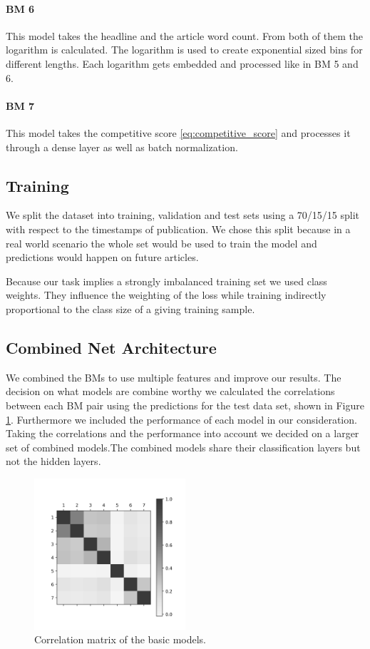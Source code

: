 \paragraph{BM 6} This model takes the headline and the article word count. From both of them the logarithm is calculated. The logarithm is used to create exponential sized bins for different lengths. Each logarithm gets embedded and processed like in BM 5 and 6.
\paragraph{BM 7} This model takes the competitive score \ref{eq:competitive_score} and processes it through a dense layer as well as batch normalization.

\subsection{Training}
We split the dataset into training, validation and test sets using a 70/15/15 split with respect to the timestamps of publication. We chose this split because in a real world scenario the whole set would be used to train the model and predictions would happen on future articles.

Because our task implies a strongly imbalanced training set we used class weights. They influence the weighting of the loss while training indirectly proportional to the class size of a giving training sample.

\subsection{Combined Net Architecture}
We combined the BMs to use multiple features and improve our results. The decision on what models are combine worthy we calculated the correlations between each BM pair using the predictions for the test data set, shown in Figure \ref{fig:correlation_matrix}. Furthermore we included the performance of each model in our consideration. Taking the correlations and the performance into account we decided on a larger set of combined models.The combined models share their classification layers but not the hidden layers.

\begin{figure}
	\includegraphics[width=0.5\textwidth]{fig/correlations_bw.png}
	\caption{Correlation matrix of the basic models.}
	\label{fig:correlation_matrix}
\end{figure}